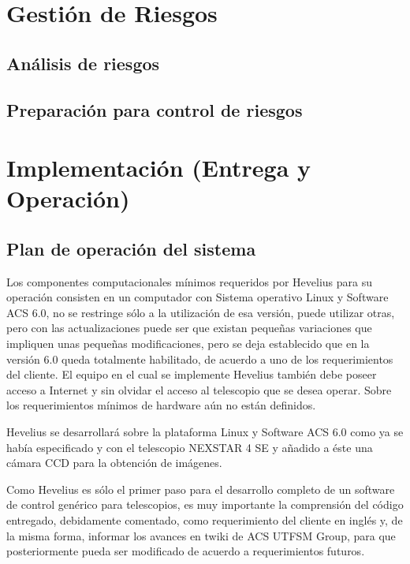 \documentclass[letterpaper,spanish,10pt]{article}
\begin{document}
\newpage
\section{Gesti\'on de Riesgos} %
\subsection{An\'alisis de riesgos}



\subsection{Preparaci\'on para control de riesgos}



\newpage
\section{Implementaci\'on (Entrega y Operaci\'on)} %
\subsection{Plan de operaci\'on del sistema}
Los componentes computacionales m\'inimos requeridos por Hevelius para su operaci\'on consisten en un computador con Sistema operativo Linux y Software ACS 6.0, no se restringe s\'olo a la utilizaci\'on de esa versi\'on, puede utilizar otras, pero con las actualizaciones puede ser que existan peque\~nas variaciones que impliquen unas peque\~nas modificaciones, pero se deja establecido que en la versi\'on 6.0 queda totalmente habilitado, de acuerdo a uno de los requerimientos del cliente.
El equipo en el cual se implemente Hevelius tambi\'en debe poseer acceso a Internet y sin olvidar el acceso al telescopio que se desea operar. Sobre los requerimientos m\'inimos de hardware a\'un no est\'an definidos.

Hevelius se desarrollar\'a sobre la plataforma Linux y Software ACS 6.0 como ya se hab\'ia especificado y con el telescopio NEXSTAR 4 SE y a\~nadido a \'este una c\'amara CCD para la obtenci\'on de im\'agenes.

Como Hevelius es s\'olo el primer paso para el desarrollo completo de un software de control gen\'erico para telescopios, es muy importante la comprensi\'on del c\'odigo entregado, debidamente comentado, como requerimiento del cliente en ingl\'es y, de la misma forma, informar los avances en twiki de ACS UTFSM Group, para que posteriormente pueda ser modificado de acuerdo a requerimientos futuros.
\end{document}
